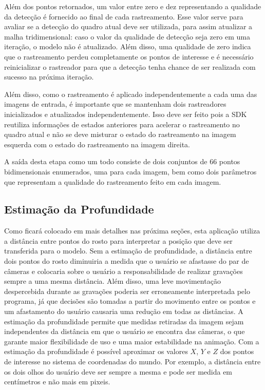 Além dos pontos retornados, um valor entre zero e dez representando a qualidade
da detecção é fornecido ao final de cada rastreamento. Esse valor serve para
avaliar se a detecção do quadro atual deve ser utilizada, para assim atualizar a
malha tridimensional: caso o valor da qualidade de detecção seja zero em uma
iteração, o modelo não é atualizado. Além disso, uma qualidade de zero indica
que o rastreamento perdeu completamente os pontos de interesse e é necessário
reinicializar o rastreador para que a detecção tenha chance de ser realizada com
sucesso na próxima iteração.

Além disso, como o rastreamento é aplicado independentemente a cada uma das
imagens de entrada, é importante que se mantenham dois rastreadores
inicializados e atualizados independentemente. Isso deve ser feito pois a SDK
reutiliza informações de estados anteriores para acelerar o rastreamento no
quadro atual e não se deve misturar o estado do rastreamento na imagem esquerda
com o estado do rastreamento na imagem direita. 

A saída desta etapa como um todo consiste de dois conjuntos de 66 pontos
bidimensionais enumerados, uma para cada imagem, bem como dois parâmetros que
representam a qualidade do rastreamento feito em cada imagem. 

\subsection{Estimação da Profundidade}

Como ficará colocado em mais detalhes nas próxima seções, esta aplicação utiliza
a distância entre pontos do rosto para interpretar a posição que deve ser
transferida para o modelo. Sem a estimação de profundidade, a distância entre
dois pontos do rosto diminuiria a medida que o usuário se afastasse do par de
câmeras e colocaria sobre o usuário a responsabilidade de realizar gravações
sempre a uma mesma distância. Além disso, uma leve movimentação despercebida
durante as gravações poderia ser erroneamente interpretada pelo programa, já que
decisões são tomadas a partir do movimento entre os pontos e um afastamento do
usuário causaria uma redução em todas as distâncias.  A estimação da
profundidade permite que medidas retiradas da imagem sejam independentes da
distância em que o usuário se encontra das câmeras, o que garante maior
flexibilidade de uso e uma maior estabilidade na animação. Com a estimação da
profundidade é possível aproximar os valores $X$, $Y$ e $Z$ dos pontos de
interesse no sistema de coordenadas do mundo. Por exemplo, a distância entre os
dois olhos do usuário deve ser sempre a mesma e pode ser medida em centímetros e
não mais em pixeis.

